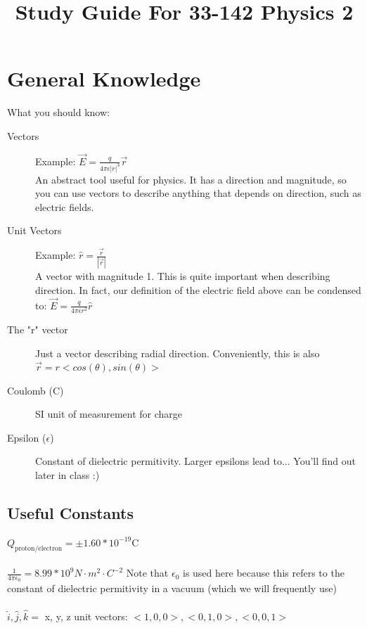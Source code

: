 \documentclass{article}
\title{
    \vspace{2in}
    \textmd{\textbf{Study Guide For 33-142 Physics 2}}\\
    \vspace{0.1in}\large{\textit{\hmwkClassInstructor}}
    \vspace{3in}
}
\author{\hmwkAuthorName}
\date{}
\begin{document}
\maketitle

\pagebreak
\section{General Knowledge}
What you should know:\\
\label{definitions}
\begin{description}
\item[Vectors]
Example: $\vec{E} = \frac{q}{4\pi\epsilon |r|^3}\vec{r}$\\
An abstract tool useful for physics. It has a direction and magnitude, so you can use vectors to describe anything that depends on direction, such as electric fields. 

\item[Unit Vectors]
Example: $\hat{r} = \frac{\vec{r}}{|\vec{r}|}$\\
A vector with magnitude 1. This is quite important when describing direction. In fact, our definition of the electric field above can be condensed to: $\vec{E} = \frac{q}{4\pi\epsilon r^2} \hat{r}$

\item[The "r" vector]
Just a vector describing radial direction. Conveniently, this is also $\vec{r} = r <cos(\theta), sin(\theta)>$

\item[Coulomb (C)]
SI unit of measurement for charge

\item[Epsilon ($\epsilon$)]
Constant of dielectric permitivity. Larger epsilons lead to... You'll find out later in class :)

\end{description} 

\subsection{Useful Constants}
$Q_{\text{proton/electron}} = \pm1.60 * 10^{-19} \text{C}$\\
\\
$\frac{1}{4\pi\epsilon_0} = 8.99 * 10^9 N\cdot m^2 \cdot C^{-2}$ Note that $\epsilon_0$ is used here because this refers to the constant of dielectric permitivity in a vacuum (which we will frequently use) \\
\\
$\hat{i}, \hat{j}, \hat{k} = $ x, y, z unit vectors: $<1,0,0>, <0,1,0>, <0,0,1>$
\end{document}
